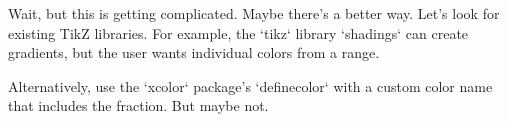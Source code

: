 \newcommand{\getSchemeColor}[2]{
  \pgfkeysgetvalue{colorScheme/#2/startColor}{\startColor}
  \pgfkeysgetvalue{colorScheme/#2/endColor}{\endColor}
  \pgfkeysgetvalue{colorScheme/#2/samples}{\samplePoints}
  \pgfutil@splitlist\samplePoints{\samplePoints}
  \pgfmathtruncatemacro{\startSample}{\samplePoints[0]}
  \pgfmathtruncatemacro{\endSample}{\samplePoints[\samplePoints-1]}
  \pgfmathtruncatemacro{\startIndex}{0}
  \pgfmathtruncatemacro{\endIndex}{0}
  \foreach \i in {1,...,\samplePoints-1} {
    \ifdim\samplePoints[\i]pt < #1 pt
      \pgfmathtruncatemacro{\startIndex}{\i}
    \else
      \pgfmathtruncatemacro{\endIndex}{\i}
      \break
    \fi
  }
  \ifdim#1 pt < \samplePoints[0] pt
    \pgfkeyssetvalue{interpolatedColor}{\startColor}!0!\endColor!100*#1
  \else\ifdim#1 pt > \samplePoints[\samplePoints-1] pt
    \pgfkeyssetvalue{interpolatedColor}{\startColor!100*#1!\endColor}
  \else
    \pgfmathsetmacro{\fractionInSegment}{(#1 - \samplePoints[\startIndex]) / (\samplePoints[\endIndex] - \samplePoints[\startIndex])}
    \pgfkeyssetvalue{interpolatedColor}{\startColor!100*\fractionInSegment!\endColor}
  \fi\fi
  \colorlet{interpolatedColor}{\pgfkeysgetvalue{interpolatedColor}}
  \typeout{interpolatedColor: \pgfkeysgetvalue{interpolatedColor}}
  \tikzset{current color/.style={\pgfkeysgetvalue{interpolatedColor}}}
  \color{interpolatedColor}
}

Wait, but this is getting complicated. Maybe there's a better way. Let's look for existing TikZ libraries. For example, the `tikz` library `shadings` can create gradients, but the user wants individual colors from a range.

Alternatively, use the `xcolor` package's `definecolor` with a custom color name that includes the fraction. But maybe not.

